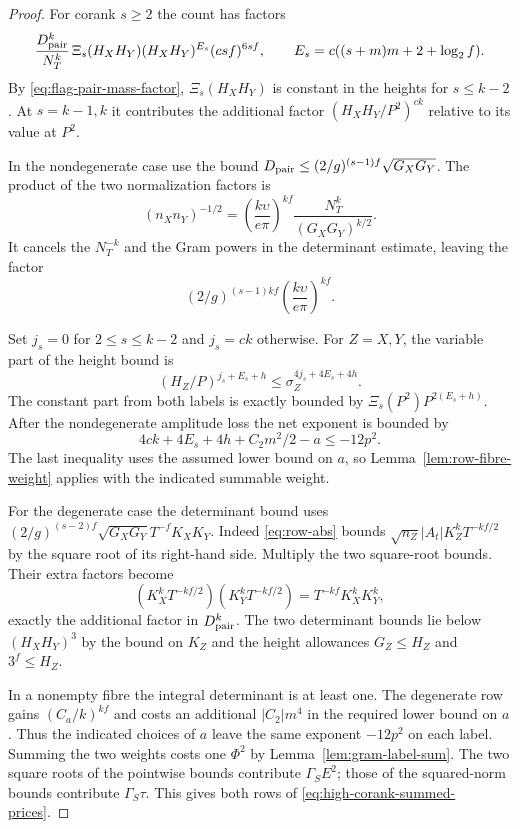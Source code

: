 \begin{proof}
For corank \(s\ge2\) the count has factors
\[
 \frac{D_{\rm pair}^k}{N_T^k}\,
 \Xi_s(H_XH_Y)(H_XH_Y)^{E_s}(csf)^{6sf},
 \qquad E_s=c((s+m)m+2+\log_2 f).
\]
By \eqref{eq:flag-pair-mass-factor}, \(\Xi_s(H_XH_Y)\) is constant in the
heights for \(s\le k-2\). At \(s=k-1,k\) it contributes the
additional factor \((H_XH_Y/P^2)^{ck}\) relative to its value at \(P^2\).

In the nondegenerate case use the bound
\(D_{\rm pair}\le(2/g)^{(s-1)f}\sqrt{G_XG_Y}\).
The product of the two normalization factors is
\[
 (n_Xn_Y)^{-1/2}
    =\left(\frac{k\upsilon}{e\pi}\right)^{kf}
        \frac{N_T^k}{(G_X G_Y)^{k/2}}.
\]
It cancels the \(N_T^{-k}\) and the Gram powers in the
determinant estimate, leaving the factor
\[
 (2/g)^{(s-1)kf}\left(\frac{k\upsilon}{e\pi}\right)^{kf}.
\]

Set \(j_s=0\) for \(2\le s\le k-2\) and \(j_s=ck\) otherwise.
For \(Z=X,Y\), the variable part of the height bound is
\[
 (H_Z/P)^{j_s+E_s+h}\le \sigma_Z^{4j_s+4E_s+4h}.
\]
The constant part from both labels is exactly bounded by
\(\Xi_s(P^2)P^{2(E_s+h)}\). After the nondegenerate amplitude loss the net exponent is bounded by
\[
       4ck+4E_s+4h+C_2m^2/2-a\le-12p^2 .
\]
The last inequality uses the assumed lower bound on \(a\),
so Lemma~\ref{lem:row-fibre-weight} applies with the indicated
summable weight.

For the degenerate case the determinant bound uses
\((2/g)^{(s-2)f}\sqrt{G_XG_Y}T^{-f}K_XK_Y\).
Indeed \eqref{eq:row-abs} bounds
\(\sqrt{n_Z}|A_t|K_Z^k T^{-kf/2}\) by the square root
of its right-hand side. Multiply the two square-root bounds. Their extra factors become
\[
      (K_X^kT^{-kf/2})(K_Y^kT^{-kf/2})
                 =T^{-kf}K_X^kK_Y^k,
\]
exactly the additional factor in \(D_{\rm pair}^k\). The two determinant
bounds lie below \((H_XH_Y)^3\) by the bound on \(K_Z\)
and the height allowances \(G_Z\le H_Z\) and \(3^f\le H_Z\).

In a nonempty fibre the integral determinant is at least one.
The degenerate row gains \((C_a/k)^{kf}\) and costs an
additional \(|C_2|m^4\) in the required lower bound on \(a\).
Thus the indicated choices of \(a\) leave the same exponent
\(-12p^2\) on each label. Summing the two weights costs one
\(\Phi^2\) by Lemma~\ref{lem:gram-label-sum}. The two square
roots of the pointwise bounds contribute \(\Gamma_S E^2\);
those of the squared-norm bounds contribute \(\Gamma_S\tau\).
This gives both rows of \eqref{eq:high-corank-summed-prices}.
\end{proof}

